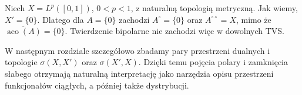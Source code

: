 \begin{przyklad}
Niech $X=L^p([0,1])$, $0<p<1$, z naturalną topologią
metryczną. Jak wiemy, $X'=\{0\}$. Dlatego dla
$A=\{0\}$ zachodzi $A^\circ=\{0\}$ oraz
$A^{\circ\circ}=X$, mimo że
$\overline{\operatorname{aco}(A)}=\{0\}$.
Twierdzenie bipolarne nie zachodzi więc w dowolnych TVS.
\end{przyklad}

\begin{uwaga}[Co dalej?]
W następnym rozdziale szczegółowo zbadamy pary
przestrzeni dualnych i topologie $\sigma(X,X')$ oraz
$\sigma(X',X)$. Dzięki temu pojęcia polary i
zamknięcia słabego otrzymają naturalną interpretację
jako narzędzia opisu przestrzeni funkcjonałów ciągłych,
a później także dystrybucji.
\end{uwaga}
